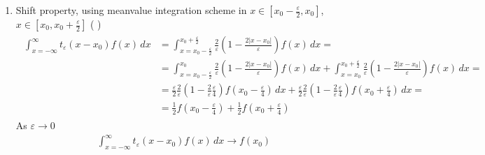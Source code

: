 \documentclass[letterpaper,10pt,english]{jupyterBook}
\begin{document}
\begin{enumerate}
\item {} 
\sphinxAtStartPar
Shift property, using mean\sphinxhyphen{}value integration scheme in \(x \in \left[x_0-\frac{\varepsilon}{2}, x_0 \right]\),  \(x \in \left[x_0, x_0+\frac{\varepsilon}{2} \right]\) ( )
\begin{equation*}
\begin{split}\begin{aligned}
   \int_{x=-\infty}^{\infty} t_{\varepsilon}(x-x_0) f(x) \, dx
   & = \int_{x=x_0-\frac{\varepsilon}{2}}^{x_0+\frac{\varepsilon}{2}} \frac{2}{\varepsilon} \left( 1 - \frac{2 |x-x_0|}{\varepsilon} \right)  f(x) \, dx = \\
   & = \int_{x=x_0-\frac{\varepsilon}{2}}^{x_0} \frac{2}{\varepsilon} \left( 1 - \frac{2 |x-x_0|}{\varepsilon} \right)  f(x) \, dx 
     + \int_{x=x_0}^{x_0+\frac{\varepsilon}{2}} \frac{2}{\varepsilon} \left( 1 - \frac{2 |x-x_0|}{\varepsilon} \right)  f(x) \, dx = \\
   & = \frac{\varepsilon}{2} \frac{2}{\varepsilon} \left( 1 - \frac{2}{\varepsilon}\frac{\varepsilon}{4} \right)  f\left(x_0-\frac{\varepsilon}{4} \right) \, dx 
     + \frac{\varepsilon}{2} \frac{2}{\varepsilon} \left( 1 - \frac{2}{\varepsilon}\frac{\varepsilon}{4} \right)  f\left(x_0+\frac{\varepsilon}{4} \right) \, dx = \\
   & = \frac{1}{2} f\left( x_0 - \frac{\varepsilon}{4} \right) + \frac{1}{2} f\left( x_0 + \frac{\varepsilon}{4} \right)
   \end{aligned}\end{split}
\end{equation*}
\sphinxAtStartPar
As \(\varepsilon \rightarrow 0\)
\begin{equation*}
\begin{split}\int_{x=-\infty}^{\infty} t_{\varepsilon}(x-x_0) f(x) \, dx \rightarrow f(x_0) \end{split}
\end{equation*}
\end{enumerate}
\end{document}
